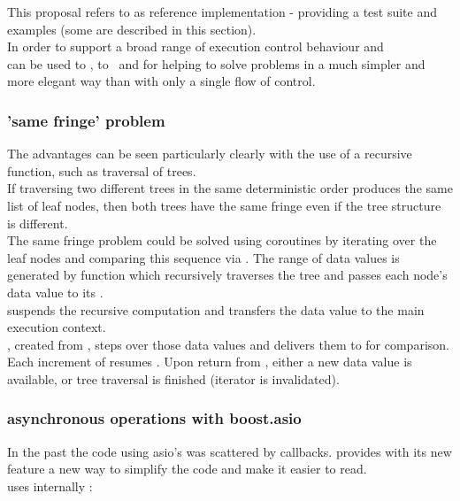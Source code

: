 
This proposal refers to \boostcoroutine as reference implementation - providing
a test suite and examples (some are described in this section).\\
\newline
In order to support a broad range of execution control behaviour \pushcoro and\\
\pullcoro can be used to \escrecloops, to \escreccomps~and for \coopmultitasking
helping to solve problems in a much simpler and more elegant way than with only
a single flow of control.

\subsubsection*{'same fringe' problem}
The advantages can be seen particularly clearly with the use of a recursive
function, such as traversal of trees.\\
If traversing two different trees in the same deterministic order produces the
same list of leaf nodes, then both trees have the same fringe even if the tree
structure is different.\\
\newline
The same fringe problem could be solved using coroutines by iterating over the
leaf nodes and comparing this sequence via . The range of data
values is generated by function  which recursively traverses the
tree and passes each node's data value to its \pushcoro.\\
\pushcoro suspends the recursive computation and transfers the data value to
the main execution context.\\
\pullcoroiterator, created from \pullcoro, steps over those data values and
delivers them to  for comparison. Each increment of \pullcoroiterator
resumes . Upon return from , either
a new data value is available, or tree traversal is finished (iterator is
invalidated).

\subsubsection*{asynchronous operations with boost.asio}
In the past the code using asio's \asyncops was scattered by callbacks.
\boostasio provides with its new \asyncres feature a new way to simplify the
code and make it easier to read.\\
\yieldcontext uses internally \boostcoroutine:

